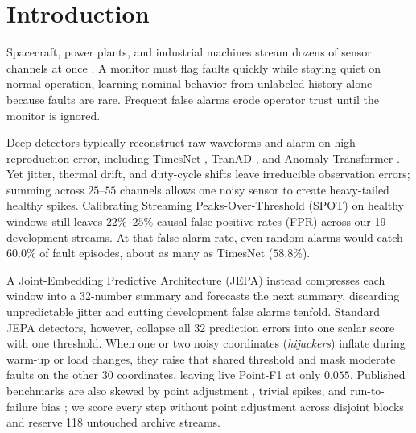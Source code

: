 \section{Introduction}
\label{sec:intro}

Spacecraft, power plants, and industrial machines stream dozens of sensor channels at once \cite{chalapathy2019deep, cuellar2024explainable, Hundman2018b}. A monitor must flag faults quickly while staying quiet on normal operation, learning nominal behavior from unlabeled history alone because faults are rare. Frequent false alarms erode operator trust until the monitor is ignored.

Deep detectors typically reconstruct raw waveforms and alarm on high reproduction error, including TimesNet \cite{wu2023timesnet}, TranAD \cite{tuli2022tranad}, and Anomaly Transformer \cite{xu2022anomaly}. Yet jitter, thermal drift, and duty-cycle shifts leave irreducible observation errors; summing across $25\text{--}55$ channels allows one noisy sensor to create heavy-tailed healthy spikes. Calibrating Streaming Peaks-Over-Threshold (SPOT) \cite{siffer2017anomaly} on healthy windows still leaves $22\%\text{--}25\%$ causal false-positive rates (FPR) across our 19 development streams. At that false-alarm rate, even random alarms would catch $60.0\%$ of fault episodes, about as many as TimesNet ($58.8\%$).

A Joint-Embedding Predictive Architecture (JEPA) \cite{lecun2022path, assran2023self, bardes2024vjepa} instead compresses each window into a 32-number summary and forecasts the next summary, discarding unpredictable jitter and cutting development false alarms tenfold. Standard JEPA detectors, however, collapse all 32 prediction errors into one scalar score with one threshold. When one or two noisy coordinates (\emph{hijackers}) inflate during warm-up or load changes, they raise that shared threshold and mask moderate faults on the other 30 coordinates, leaving live Point-F1 at only $0.055$. Published benchmarks are also skewed by point adjustment \cite{kim2022towards}, trivial spikes, and run-to-failure bias \cite{wu2023flawed}; we score every step without point adjustment across disjoint blocks and reserve 118 untouched archive streams.

